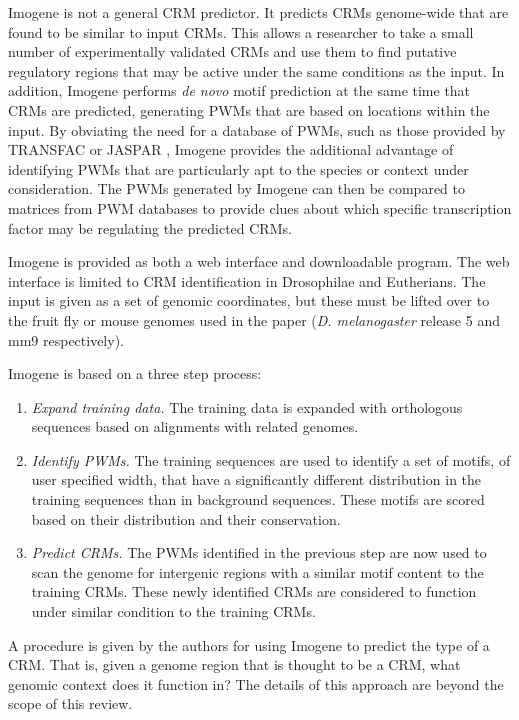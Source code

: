 \documentclass{frontiersENG} %
\begin{document}
Imogene \cite{Rouault2014} is not a general CRM predictor. It predicts
CRMs genome-wide that are found to be similar to input CRMs. This
allows a researcher to take a small number of experimentally validated
CRMs and use them to find putative regulatory regions that may be
active under the same conditions as the input. In addition, Imogene
performs \textit{de novo} motif prediction at the same time that CRMs
are predicted, generating PWMs that are based on locations within the
input. By obviating the need for a database of PWMs, such as those
provided by TRANSFAC \cite{Matys2003} or JASPAR \cite{Mathelier2014},
Imogene provides the additional advantage of identifying PWMs that are
particularly apt to the species or context under consideration. The
PWMs generated by Imogene can then be compared to matrices from PWM
databases to provide clues about which specific transcription factor
may be regulating the predicted CRMs.

Imogene is provided as both a web interface and downloadable
program. The web interface is limited to CRM identification in
Drosophilae and Eutherians. The input is given as a set of genomic
coordinates, but these must be lifted over to the fruit fly or mouse
genomes used in the paper (\textit{D. melanogaster} release 5 and mm9
respectively).

Imogene is based on a three step process:
\begin{enumerate}
\item{\textit{Expand training data.} The training data is expanded with orthologous sequences based on alignments with related genomes.}
\item{\textit{Identify PWMs.} The training sequences are used to identify a set of motifs, of user specified width, that have a significantly different distribution in the training sequences than in background sequences. These motifs are scored based on their distribution and their conservation.}
\item{\textit{Predict CRMs.} The PWMs identified in the previous step are now used to scan the genome for intergenic regions with a similar motif content to the training CRMs. These newly identified CRMs are considered to function under similar condition to the training CRMs.}
\end{enumerate}

A procedure is given by the authors for using Imogene to predict the
type of a CRM. That is, given a genome region that is thought to be a
CRM, what genomic context does it function in? The details of this
approach are beyond the scope of this review.
\end{document}
